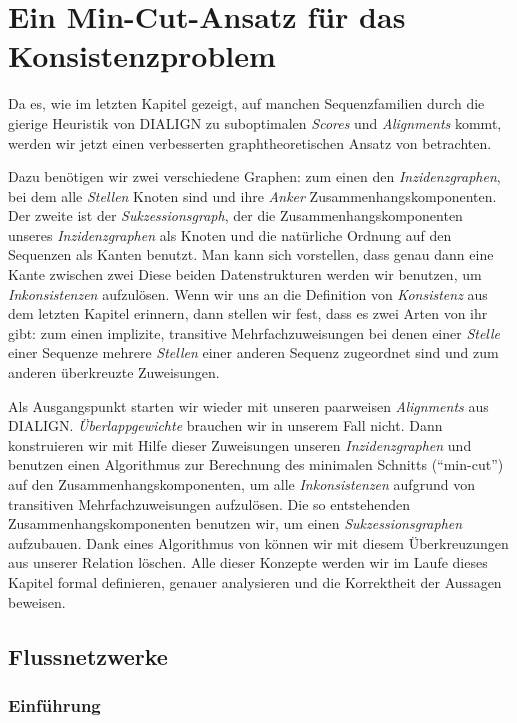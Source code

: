 \chapter{Ein Min-Cut-Ansatz für das Konsistenzproblem}
\label{ch:min-cut}
Da es, wie im letzten Kapitel gezeigt, auf manchen Sequenzfamilien durch die gierige Heuristik von DIALIGN zu suboptimalen \emph{Scores} und \emph{Alignments} kommt, werden wir jetzt einen verbesserten graphtheoretischen Ansatz von \cite{cpm10} betrachten.

Dazu benötigen wir zwei verschiedene Graphen: zum einen den \emph{Inzidenzgraphen}, bei dem alle \emph{Stellen} Knoten sind und ihre \emph{Anker} Zusammenhangskomponenten. Der zweite ist der \emph{Sukzessionsgraph}, der die Zusammenhangskomponenten unseres \emph{Inzidenzgraphen} als Knoten und die natürliche Ordnung auf den Sequenzen als Kanten benutzt. Man kann sich vorstellen, dass genau dann eine Kante zwischen zwei  Diese beiden Datenstrukturen werden wir benutzen, um \emph{Inkonsistenzen} aufzulösen. Wenn wir uns an die Definition von \emph{Konsistenz} aus dem letzten Kapitel erinnern, dann stellen wir fest, dass es zwei Arten von ihr gibt: zum einen implizite, transitive Mehrfachzuweisungen bei denen einer \emph{Stelle} einer Sequenze mehrere \emph{Stellen} einer anderen Sequenz zugeordnet sind und zum anderen überkreuzte Zuweisungen.

Als Ausgangspunkt starten wir wieder mit unseren paarweisen \emph{Alignments} aus DIALIGN. \emph{Überlappgewichte} brauchen wir in unserem Fall nicht. Dann konstruieren wir mit Hilfe dieser Zuweisungen unseren \emph{Inzidenzgraphen} und benutzen einen Algorithmus zur Berechnung des minimalen Schnitts (\enquote{min-cut}) auf den Zusammenhangskomponenten, um alle \emph{Inkonsistenzen} aufgrund von transitiven Mehrfachzuweisungen aufzulösen. Die so entstehenden Zusammenhangskomponenten benutzen wir, um einen \emph{Sukzessionsgraphen} aufzubauen. Dank eines Algorithmus von \cite{pdc10} können wir mit diesem Überkreuzungen aus unserer Relation löschen. Alle dieser Konzepte werden wir im Laufe dieses Kapitel formal definieren, genauer analysieren und die Korrektheit der Aussagen beweisen.
 
\section{Flussnetzwerke}

\subsection{Einführung}


